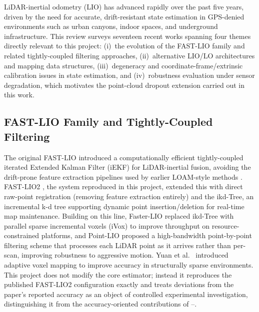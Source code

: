 \documentclass[conference]{IEEEtran}
\begin{document}
LiDAR-inertial odometry (LIO) has advanced rapidly over the past five years, driven by the need for accurate, drift-resistant state estimation in GPS-denied environments such as urban canyons, indoor spaces, and underground infrastructure. This review surveys seventeen recent works spanning four themes directly relevant to this project: (i)~the evolution of the FAST-LIO family and related tightly-coupled filtering approaches, (ii)~alternative LIO/LO architectures and mapping data structures, (iii)~degeneracy and coordinate-frame/extrinsic calibration issues in state estimation, and (iv)~robustness evaluation under sensor degradation, which motivates the point-cloud dropout extension carried out in this work.

\subsection{FAST-LIO Family and Tightly-Coupled Filtering}
The original FAST-LIO \cite{fastlio} introduced a computationally efficient tightly-coupled iterated Extended Kalman Filter (iEKF) for LiDAR-inertial fusion, avoiding the drift-prone feature extraction pipelines used by earlier LOAM-style methods \cite{loam}. FAST-LIO2 \cite{fastlio2}, the system reproduced in this project, extended this with direct raw-point registration (removing feature extraction entirely) and the ikd-Tree, an incremental k-d tree supporting dynamic point insertion/deletion for real-time map maintenance. Building on this line, Faster-LIO \cite{fasterlio} replaced ikd-Tree with parallel sparse incremental voxels (iVox) to improve throughput on resource-constrained platforms, and Point-LIO \cite{pointlio} proposed a high-bandwidth point-by-point filtering scheme that processes each LiDAR point as it arrives rather than per-scan, improving robustness to aggressive motion. Yuan et al.~\cite{voxelmap} introduced adaptive voxel mapping to improve accuracy in structurally sparse environments. This project does not modify the core estimator; instead it reproduces the published FAST-LIO2 configuration exactly and treats deviations from the paper's reported accuracy as an object of controlled experimental investigation, distinguishing it from the accuracy-oriented contributions of \cite{fastlio}--\cite{voxelmap}.
\end{document}
